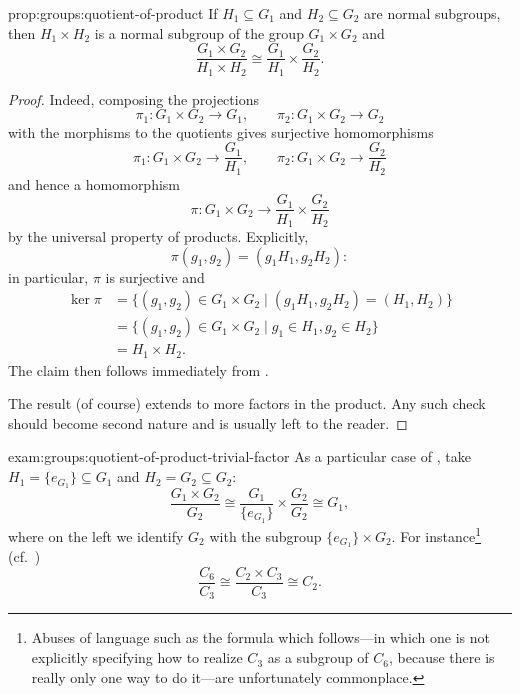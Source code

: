 \begin{prop}{}{prop:groups:quotient-of-product}
  If $H_1 \subseteq G_1$ and $H_2 \subseteq G_2$ are normal
subgroups, then $H_1 \times H_2$ is a normal subgroup of the group
$G_1 \times G_2$ and
\[
  \frac{G_1 \times G_2}{H_1 \times H_2} \cong \frac{G_1}{H_1} \times
  \frac{G_2}{H_2}.
\]
\end{prop}
\begin{proof}
  Indeed, composing the projections
  \[
    \pi_1 : G_1 \times G_2 \to G_1, \qquad \pi_2 : G_1 \times G_2 \to
    G_2
  \]
  with the morphisms to the quotients gives surjective homomorphisms
  \[
    \pi_1 : G_1 \times G_2 \to \frac{G_1}{H_1}, \qquad \pi_2 : G_1
    \times G_2 \to \frac{G_2}{H_2}
  \]
  and hence a homomorphism
  \[
    \pi : G_1 \times G_2 \to \frac{G_1}{H_1} \times \frac{G_2}{H_2}
  \]
  by the universal property of products. Explicitly,
  \[
    \pi(g_1, g_2) = (g_1H_1, g_2H_2):
  \]
  in particular, $\pi$ is surjective and
  \begin{align*}
    \ker\pi &= \{(g_1,g_2) \in G_1 \times G_2 \mid (g_1H_1, g_2H_2) = (H_1,H_2)\} \\
            &= \{(g_1,g_2) \in G_1 \times G_2 \mid g_1 \in H_1, g_2 \in H_2\} \\
            &= H_1 \times H_2.
  \end{align*}
  The claim then follows immediately from
  .

  The result (of course) extends to more factors in the product. Any
  such check should become second nature and is usually left to the
  reader.
\end{proof}

\begin{exam}{}{exam:groups:quotient-of-product-trivial-factor}
  As a particular case of
  , take
  $H_1 = \{e_{G_1}\} \subseteq G_1$ and $H_2 = G_2 \subseteq G_2$:
  \[
    \frac{G_1 \times G_2}{G_2} \cong \frac{G_1}{\{e_{G_1}\}} \times
    \frac{G_2}{G_2} \cong G_1,
  \]
  where on the left we identify $G_2$ with the subgroup
  $\{e_{G_1}\} \times G_2$. For instance\footnote{Abuses of language
    such as the formula which follows---in which one is not explicitly
    specifying how to realize $C_3$ as a subgroup of $C_6$, because
    there is really only one way to do it---are unfortunately
    commonplace.} (cf.\ )
  \[
    \frac{C_6}{C_3} \cong \frac{C_2 \times C_3}{C_3} \cong C_2.
  \]
\end{exam}

